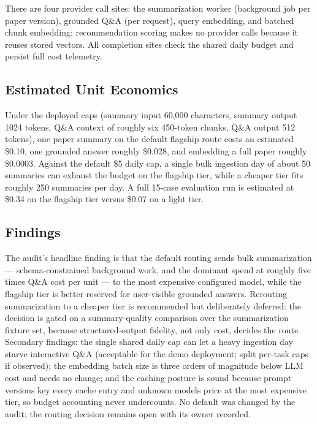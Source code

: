 There are four provider call sites: the summarization worker (background job per paper version), grounded Q\&A (per request), query embedding, and batched chunk embedding; recommendation scoring makes no provider calls because it reuses stored vectors.
All completion sites check the shared daily budget and persist full cost telemetry.

\subsection{Estimated Unit Economics}

Under the deployed caps (summary input 60{,}000 characters, summary output 1024 tokens, Q\&A context of roughly six 450-token chunks, Q\&A output 512 tokens), one paper summary on the default flagship route costs an estimated \$0.10, one grounded answer roughly \$0.028, and embedding a full paper roughly \$0.0003.
Against the default \$5 daily cap, a single bulk ingestion day of about 50 summaries can exhaust the budget on the flagship tier, while a cheaper tier fits roughly 250 summaries per day.
A full 15-case evaluation run is estimated at \$0.34 on the flagship tier versus \$0.07 on a light tier.

\subsection{Findings}

The audit's headline finding is that the default routing sends bulk summarization --- schema-constrained background work, and the dominant spend at roughly five times Q\&A cost per unit --- to the most expensive configured model, while the flagship tier is better reserved for user-visible grounded answers.
Rerouting summarization to a cheaper tier is recommended but deliberately deferred: the decision is gated on a summary-quality comparison over the summarization fixture set, because structured-output fidelity, not only cost, decides the route.
Secondary findings: the single shared daily cap can let a heavy ingestion day starve interactive Q\&A (acceptable for the demo deployment; split per-task caps if observed); the embedding batch size is three orders of magnitude below LLM cost and needs no change; and the caching posture is sound because prompt versions key every cache entry and unknown models price at the most expensive tier, so budget accounting never undercounts.
No default was changed by the audit; the routing decision remains open with its owner recorded.

